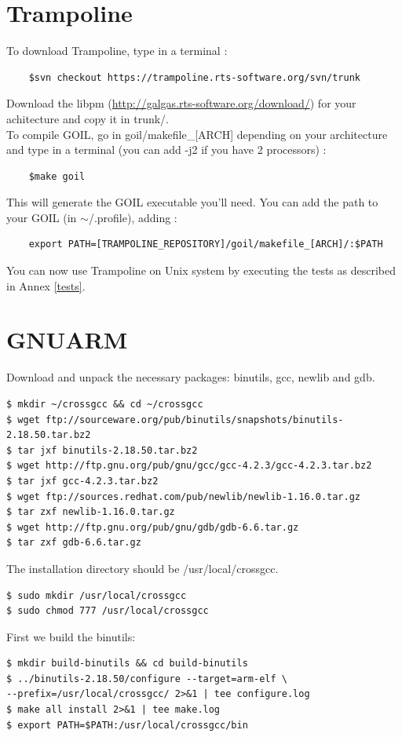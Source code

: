 \section{Trampoline}
To download Trampoline, type in a terminal :
	\begin{verbatim}
	$svn checkout https://trampoline.rts-software.org/svn/trunk
	\end{verbatim}
Download the libpm (\href{http://galgas.rts-software.org/download/}{http://galgas.rts-software.org/download/}) for your achitecture and copy it in trunk/.\\
To compile GOIL, go in goil/makefile\_[ARCH] depending on your architecture and type in a terminal (you can add -j2 if you have 2 processors) :
	\begin{verbatim}
	$make goil
	\end{verbatim}
This will generate the GOIL executable you'll need. You can add the path to your GOIL (in $\sim$/.profile), adding :
	\begin{verbatim}
	export PATH=[TRAMPOLINE_REPOSITORY]/goil/makefile_[ARCH]/:$PATH
	\end{verbatim}

You can now use Trampoline on Unix system by executing the tests as described in Annex \ref{tests}.

\section{GNUARM}
Download and unpack the necessary packages: binutils, gcc, newlib and gdb.
\begin{verbatim}
$ mkdir ~/crossgcc && cd ~/crossgcc
$ wget ftp://sourceware.org/pub/binutils/snapshots/binutils-2.18.50.tar.bz2
$ tar jxf binutils-2.18.50.tar.bz2
$ wget http://ftp.gnu.org/pub/gnu/gcc/gcc-4.2.3/gcc-4.2.3.tar.bz2
$ tar jxf gcc-4.2.3.tar.bz2
$ wget ftp://sources.redhat.com/pub/newlib/newlib-1.16.0.tar.gz
$ tar zxf newlib-1.16.0.tar.gz
$ wget http://ftp.gnu.org/pub/gnu/gdb/gdb-6.6.tar.gz
$ tar zxf gdb-6.6.tar.gz
\end{verbatim}

The installation directory should be /usr/local/crossgcc.

\begin{verbatim}
$ sudo mkdir /usr/local/crossgcc
$ sudo chmod 777 /usr/local/crossgcc
\end{verbatim}

First we build the binutils:

\begin{verbatim}
$ mkdir build-binutils && cd build-binutils
$ ../binutils-2.18.50/configure --target=arm-elf \
--prefix=/usr/local/crossgcc/ 2>&1 | tee configure.log
$ make all install 2>&1 | tee make.log
$ export PATH=$PATH:/usr/local/crossgcc/bin
\end{verbatim}


